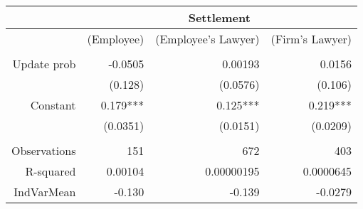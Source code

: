 \begin{tabular}{rrrr}
\toprule
      & \multicolumn{3}{c}{Settlement} \\
\midrule
      & \multicolumn{1}{c}{(Employee)} & \multicolumn{1}{c}{(Employee's Lawyer)} & \multicolumn{1}{c}{(Firm's Lawyer)} \\
      & \multicolumn{1}{c}{} & \multicolumn{1}{c}{} & \multicolumn{1}{c}{} \\
Update prob & -0.0505 & 0.00193 & 0.0156 \\
      & (0.128) & (0.0576) & (0.106) \\
Constant  & 0.179*** & 0.125*** & 0.219*** \\
      & (0.0351) & (0.0151) & (0.0209) \\
      &       &       &  \\
Observations & 151   & 672   & 403 \\
R-squared & 0.00104 & 0.00000195 & 0.0000645 \\
IndVarMean & -0.130 & -0.139 & -0.0279 \\
\bottomrule
\end{tabular}%
